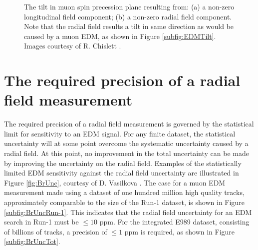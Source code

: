 \begin{figure}[t!]
\centering{}
 \hfill  
{}
\caption{The tilt in muon spin precession plane resulting from: (a) a non-zero longitudinal field component; (b) a non-zero radial field component. Note that the radial field results a tilt in same direction as would be caused by a muon EDM, as shown in Figure \ref{subfig:EDMTilt}. Images courtesy of R. Chislett \cite{BeckyGeometry}.}
\label{fig:Tilt2}
\end{figure}
%

\section[The required precision of a radial field measurement]{The required precision of a radial field measurement}\label{sec:BrPrecision}

The required precision of a radial field measurement is governed by the statistical limit for sensitivity to an EDM signal. For any finite dataset, the statistical uncertainty will at some point overcome the systematic uncertainty caused by a radial field. At this point, no improvement in the total uncertainty can be made by improving the uncertainty on the radial field. Examples of the statistically limited EDM sensitivity against the radial field uncertainty are illustrated in Figure \ref{fig:BrUnc}, courtesy of D. Vasilkova \cite{DominikaCMJuly2021}. The case for a muon EDM measurement made using a dataset of one hundred million high quality tracks, approximately comparable to the size of the Run-1 dataset, is shown in Figure \ref{subfig:BrUncRun-1}. This indicates that the radial field uncertainty for an EDM search in Run-1 must be $\leq10$ ppm. For the integrated E989 dataset, consisting of billions of tracks, a precision of $\leq1$ ppm is required, as shown in Figure \ref{subfig:BrUncTot}. 

